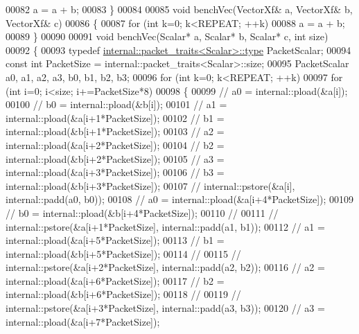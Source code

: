\begin{DoxyCode}
00082         a = a + b;
00083 \}
00084 
00085 \textcolor{keywordtype}{void} benchVec(VectorXf& a, VectorXf& b, VectorXf& c)
00086 \{
00087     \textcolor{keywordflow}{for} (\textcolor{keywordtype}{int} k=0; k<REPEAT; ++k)
00088         a = a + b;
00089 \}
00090 
00091 \textcolor{keywordtype}{void} benchVec(Scalar* a, Scalar* b, Scalar* c, \textcolor{keywordtype}{int} size)
00092 \{
00093     \textcolor{keyword}{typedef} \hyperlink{group___sparse_core___module}{internal::packet\_traits<Scalar>::type} PacketScalar;
00094     \textcolor{keyword}{const} \textcolor{keywordtype}{int} PacketSize = internal::packet\_traits<Scalar>::size;
00095     PacketScalar a0, a1, a2, a3, b0, b1, b2, b3;
00096     \textcolor{keywordflow}{for} (\textcolor{keywordtype}{int} k=0; k<REPEAT; ++k)
00097         \textcolor{keywordflow}{for} (\textcolor{keywordtype}{int} i=0; i<size; i+=PacketSize*8)
00098         \{
00099 \textcolor{comment}{//             a0 = internal::pload(&a[i]);}
00100 \textcolor{comment}{//             b0 = internal::pload(&b[i]);}
00101 \textcolor{comment}{//             a1 = internal::pload(&a[i+1*PacketSize]);}
00102 \textcolor{comment}{//             b1 = internal::pload(&b[i+1*PacketSize]);}
00103 \textcolor{comment}{//             a2 = internal::pload(&a[i+2*PacketSize]);}
00104 \textcolor{comment}{//             b2 = internal::pload(&b[i+2*PacketSize]);}
00105 \textcolor{comment}{//             a3 = internal::pload(&a[i+3*PacketSize]);}
00106 \textcolor{comment}{//             b3 = internal::pload(&b[i+3*PacketSize]);}
00107 \textcolor{comment}{//             internal::pstore(&a[i], internal::padd(a0, b0));}
00108 \textcolor{comment}{//             a0 = internal::pload(&a[i+4*PacketSize]);}
00109 \textcolor{comment}{//             b0 = internal::pload(&b[i+4*PacketSize]);}
00110 \textcolor{comment}{//             }
00111 \textcolor{comment}{//             internal::pstore(&a[i+1*PacketSize], internal::padd(a1, b1));}
00112 \textcolor{comment}{//             a1 = internal::pload(&a[i+5*PacketSize]);}
00113 \textcolor{comment}{//             b1 = internal::pload(&b[i+5*PacketSize]);}
00114 \textcolor{comment}{//             }
00115 \textcolor{comment}{//             internal::pstore(&a[i+2*PacketSize], internal::padd(a2, b2));}
00116 \textcolor{comment}{//             a2 = internal::pload(&a[i+6*PacketSize]);}
00117 \textcolor{comment}{//             b2 = internal::pload(&b[i+6*PacketSize]);}
00118 \textcolor{comment}{//             }
00119 \textcolor{comment}{//             internal::pstore(&a[i+3*PacketSize], internal::padd(a3, b3));}
00120 \textcolor{comment}{//             a3 = internal::pload(&a[i+7*PacketSize]);}

\end{DoxyCode}
